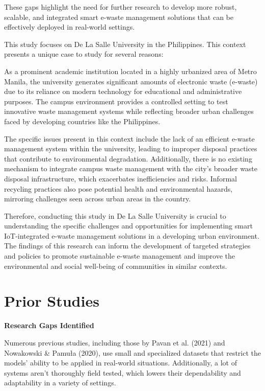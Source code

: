 These gaps highlight the need for further research to develop more robust, scalable, and integrated smart e-waste management solutions that can be effectively deployed in real-world settings.

This study focuses on De La Salle University in the Philippines. This context presents a unique case to study for several reasons: 

As a prominent academic institution located in a highly urbanized area of Metro Manila, the university generates significant amounts of electronic waste (e-waste) due to its reliance on modern technology for educational and administrative purposes. The campus environment provides a controlled setting to test innovative waste management systems while reflecting broader urban challenges faced by developing countries like the Philippines.

The specific issues present in this context include the lack of an efficient e-waste management system within the university, leading to improper disposal practices that contribute to environmental degradation. Additionally, there is no existing mechanism to integrate campus waste management with the city's broader waste disposal infrastructure, which exacerbates inefficiencies and risks. Informal recycling practices also pose potential health and environmental hazards, mirroring challenges seen across urban areas in the country.

Therefore, conducting this study in De La Salle University is crucial to understanding the specific challenges and opportunities for implementing smart IoT-integrated e-waste management solutions in a developing urban environment. The findings of this research can inform the development of targeted strategies and policies to promote sustainable e-waste management and improve the environmental and social well-being of communities in similar contexts.

\section{Prior Studies}

\textbf{Research Gaps Identified}

Numerous previous studies, including those by Pavan et al. (2021) and Nowakowski & Pamuła (2020), use small and specialized datasets that restrict the models' ability to be applied in real-world situations. Additionally, a lot of systems aren't thoroughly field tested, which lowers their dependability and adaptability in a variety of settings.

